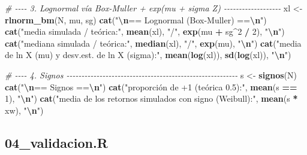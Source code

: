 \documentclass[
  spanish,
]{article}
\newenvironment{Shaded}{\begin{snugshade}}{\end{snugshade}}
\newcommand{\CommentTok}[1]{\textcolor[rgb]{0.56,0.35,0.01}{\textit{#1}}}
\newcommand{\DecValTok}[1]{\textcolor[rgb]{0.00,0.00,0.81}{#1}}
\newcommand{\FunctionTok}[1]{\textcolor[rgb]{0.13,0.29,0.53}{\textbf{#1}}}
\newcommand{\NormalTok}[1]{#1}
\newcommand{\OtherTok}[1]{\textcolor[rgb]{0.56,0.35,0.01}{#1}}
\newcommand{\SpecialCharTok}[1]{\textcolor[rgb]{0.81,0.36,0.00}{\textbf{#1}}}
\newcommand{\StringTok}[1]{\textcolor[rgb]{0.31,0.60,0.02}{#1}}
\begin{document}
\begin{Shaded}
\begin{Highlighting}[]
\CommentTok{\# {-}{-}{-}{-} 3. Lognormal vía Box{-}Muller + exp(mu + sigma Z) {-}{-}{-}{-}{-}{-}{-}{-}{-}{-}{-}{-}{-}{-}{-}{-}{-}{-}{-}}
\NormalTok{xl }\OtherTok{\textless{}{-}} \FunctionTok{rlnorm\_bm}\NormalTok{(N, mu, sg)}
\FunctionTok{cat}\NormalTok{(}\StringTok{"}\SpecialCharTok{\textbackslash{}n}\StringTok{== Lognormal (Box{-}Muller) ==}\SpecialCharTok{\textbackslash{}n}\StringTok{"}\NormalTok{)}
\FunctionTok{cat}\NormalTok{(}\StringTok{"media simulada / teórica:"}\NormalTok{, }\FunctionTok{mean}\NormalTok{(xl), }\StringTok{"/"}\NormalTok{, }\FunctionTok{exp}\NormalTok{(mu }\SpecialCharTok{+}\NormalTok{ sg}\SpecialCharTok{\^{}}\DecValTok{2} \SpecialCharTok{/} \DecValTok{2}\NormalTok{), }\StringTok{"}\SpecialCharTok{\textbackslash{}n}\StringTok{"}\NormalTok{)}
\FunctionTok{cat}\NormalTok{(}\StringTok{"mediana simulada / teórica:"}\NormalTok{, }\FunctionTok{median}\NormalTok{(xl), }\StringTok{"/"}\NormalTok{, }\FunctionTok{exp}\NormalTok{(mu), }\StringTok{"}\SpecialCharTok{\textbackslash{}n}\StringTok{"}\NormalTok{)}
\FunctionTok{cat}\NormalTok{(}\StringTok{"media de ln X (mu) y desv.est. de ln X (sigma):"}\NormalTok{, }\FunctionTok{mean}\NormalTok{(}\FunctionTok{log}\NormalTok{(xl)), }\FunctionTok{sd}\NormalTok{(}\FunctionTok{log}\NormalTok{(xl)), }\StringTok{"}\SpecialCharTok{\textbackslash{}n}\StringTok{"}\NormalTok{)}

\CommentTok{\# {-}{-}{-}{-} 4. Signos {-}{-}{-}{-}{-}{-}{-}{-}{-}{-}{-}{-}{-}{-}{-}{-}{-}{-}{-}{-}{-}{-}{-}{-}{-}{-}{-}{-}{-}{-}{-}{-}{-}{-}{-}{-}{-}{-}{-}{-}{-}{-}{-}{-}{-}{-}{-}{-}{-}{-}{-}{-}{-}{-}{-}{-}{-}}
\NormalTok{s }\OtherTok{\textless{}{-}} \FunctionTok{signos}\NormalTok{(N)}
\FunctionTok{cat}\NormalTok{(}\StringTok{"}\SpecialCharTok{\textbackslash{}n}\StringTok{== Signos ==}\SpecialCharTok{\textbackslash{}n}\StringTok{"}\NormalTok{)}
\FunctionTok{cat}\NormalTok{(}\StringTok{"proporción de +1 (teórica 0.5):"}\NormalTok{, }\FunctionTok{mean}\NormalTok{(s }\SpecialCharTok{==} \DecValTok{1}\NormalTok{), }\StringTok{"}\SpecialCharTok{\textbackslash{}n}\StringTok{"}\NormalTok{)}
\FunctionTok{cat}\NormalTok{(}\StringTok{"media de los retornos simulados con signo (Weibull):"}\NormalTok{, }\FunctionTok{mean}\NormalTok{(s }\SpecialCharTok{*}\NormalTok{ xw), }\StringTok{"}\SpecialCharTok{\textbackslash{}n}\StringTok{"}\NormalTok{)}
\end{Highlighting}
\end{Shaded}

\subsection{04\_validacion.R}\label{validacion.r}
\end{document}
